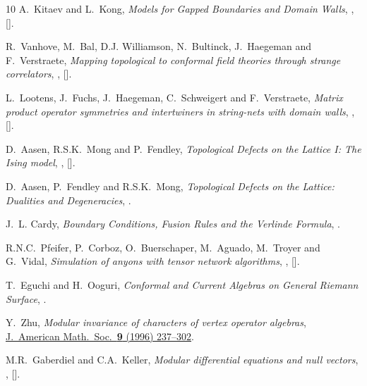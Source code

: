 \begin{thebibliography}{10}
A.~Kitaev and L.~Kong,
\textit{Models for Gapped Boundaries and Domain Walls},
,
[].

R.~Vanhove, M.~Bal, D.J. Williamson, N.~Bultinck, J.~Haegeman and
  F.~Verstraete,
\textit{Mapping topological to conformal field theories through
  strange correlators},
,
[].

L.~Lootens, J.~Fuchs, J.~Haegeman, C.~Schweigert and F.~Verstraete,
\textit{Matrix product operator symmetries and intertwiners in string-nets with domain walls},
,
[].

D.~Aasen, R.S.K.~Mong and P.~Fendley,
\textit{Topological Defects on the Lattice I: The Ising model},
,
[].

D.~Aasen, P.~Fendley and R.S.K.~Mong,
\textit{Topological Defects on the Lattice: Dualities and
  Degeneracies}, 
.

J.~L. Cardy,
\textit{Boundary Conditions, Fusion Rules and the Verlinde Formula},
.

R.N.C.~Pfeifer, P.~Corboz, O.~Buerschaper, M.~Aguado, M.~Troyer and G.~Vidal,
\textit{Simulation of anyons with tensor network algorithms},
,
[].

T.~Eguchi and H.~Ooguri,
\textit{Conformal and Current Algebras on General Riemann Surface},
.

Y.~Zhu,
\textit{Modular invariance of characters of vertex operator algebras},
\href{https://www.jstor.org/stable/2152847}{J.\ American Math.\ Soc.\ \textbf{9} (1996) 237--302}.

M.R.~Gaberdiel and C.A.~Keller,
\textit{Modular differential equations and null vectors},
,
[].


\end{thebibliography}
